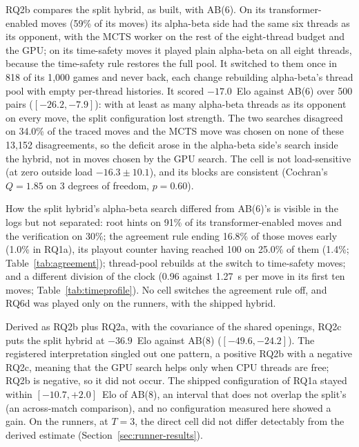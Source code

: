 \documentclass{article}
\begin{document}
RQ2b compares the split hybrid, as built, with AB(6). On its transformer-enabled moves (59\% of its moves) its alpha-beta side had the same six threads as its opponent, with the MCTS worker on the rest of the eight-thread budget and the GPU; on its time-safety moves it played plain alpha-beta on all eight threads, because the time-safety rule restores the full pool. It switched to them once in 818 of its 1{,}000 games and never back, each change rebuilding alpha-beta's thread pool with empty per-thread histories. It scored $-17.0$~Elo against AB(6) over 500 pairs ($[-26.2, -7.9]$): with at least as many alpha-beta threads as its opponent on every move, the split configuration lost strength. The two searches disagreed on 34.0\% of the traced moves and the MCTS move was chosen on none of these 13{,}152 disagreements, so the deficit arose in the alpha-beta side's search inside the hybrid, not in moves chosen by the GPU search. The cell is not load-sensitive (at zero outside load $-16.3 \pm 10.1$), and its blocks are consistent (Cochran's $Q = 1.85$ on 3 degrees of freedom, $p = 0.60$).

How the split hybrid's alpha-beta search differed from AB(6)'s is visible in the logs but not separated: root hints on 91\% of its transformer-enabled moves and the verification on 30\%; the agreement rule ending 16.8\% of those moves early (1.0\% in RQ1a), its playout counter having reached 100 on 25.0\% of them (1.4\%; Table~\ref{tab:agreement}); thread-pool rebuilds at the switch to time-safety moves; and a different division of the clock (0.96 against 1.27~s per move in its first ten moves; Table~\ref{tab:timeprofile}). No cell switches the agreement rule off, and RQ6d was played only on the runners, with the shipped hybrid.

Derived as RQ2b plus RQ2a, with the covariance of the shared openings, RQ2c puts the split hybrid at $-36.9$~Elo against AB(8) ($[-49.6, -24.2]$). The registered interpretation singled out one pattern, a positive RQ2b with a negative RQ2c, meaning that the GPU search helps only when CPU threads are free; RQ2b is negative, so it did not occur. The shipped configuration of RQ1a stayed within $[-10.7, +2.0]$~Elo of AB(8), an interval that does not overlap the split's (an across-match comparison), and no configuration measured here showed a gain. On the runners, at $T = 3$, the direct cell did not differ detectably from the derived estimate (Section~\ref{sec:runner-results}).
\end{document}
